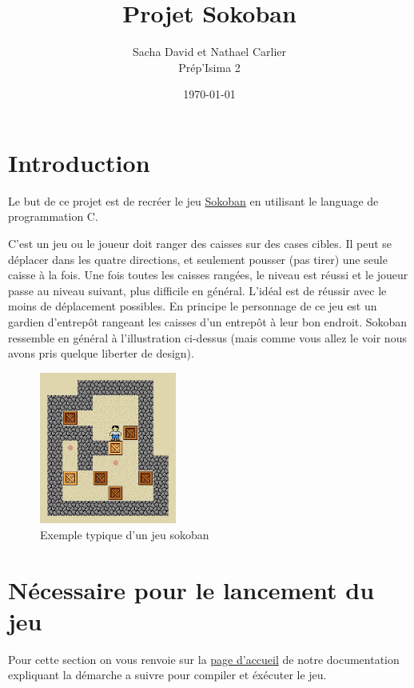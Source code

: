 \documentclass[french, 12pt]{article}
\title{Projet Sokoban}
\author{Sacha David et Nathael Carlier\\
        Prép'Isima 2}
\date{\today}
\begin{document}
\maketitle

\tableofcontents
    
\section{Introduction}

    Le but de ce projet est de recréer le jeu \href{https://fr.wikipedia.org/wiki/Sokoban}{Sokoban} en utilisant le language de programmation C. 

    C'est un jeu ou le joueur doit ranger des caisses sur des cases cibles. Il peut se déplacer dans les quatre directions, et seulement pousser (pas tirer) une seule caisse à la fois. Une fois toutes les caisses rangées, le niveau est réussi et le joueur passe au niveau suivant, plus difficile en général. L'idéal est de réussir avec le moins de déplacement possibles. En principe le personnage de ce jeu est un gardien d'entrepôt rangeant les caisses d'un entrepôt à leur bon endroit. Sokoban ressemble en général à l'illustration ci-dessus (mais comme vous allez le voir nous avons pris quelque liberter de design).

    \begin{figure}[h]
        \centering
        \includegraphics[width=0.4\textwidth]{illustration/base_sokoban.png}
        \caption{Exemple typique d'un jeu sokoban}
    \end{figure}

\section{Nécessaire pour le lancement du jeu}

Pour cette section on vous renvoie sur la \href{../doc/redirect.html}{page d'accueil} de notre documentation expliquant la démarche a suivre pour compiler et éxécuter le jeu.
\end{document}
